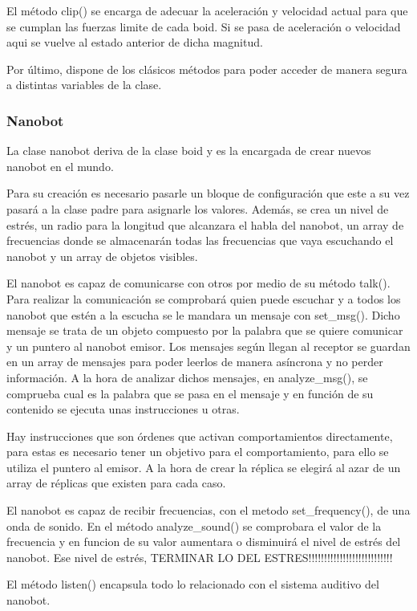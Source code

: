 El método clip() se encarga de adecuar la aceleración y velocidad actual para que se cumplan las fuerzas limite de cada boid. Si se pasa de aceleración o velocidad aqui se vuelve al estado anterior de dicha magnitud.
 
Por último, dispone de los clásicos métodos para poder acceder de manera segura a distintas variables de la clase.

\subsubsection{Nanobot}
\label{sec:nanobot}

La clase nanobot deriva de la clase boid y es la encargada de crear nuevos nanobot en el mundo.
 
Para su creación es necesario pasarle un bloque de configuración que este a su vez pasará a la clase padre para asignarle los valores. Además, se crea un nivel de estrés, un radio para la longitud que alcanzara el habla del nanobot, un array de frecuencias donde se almacenarán todas las frecuencias que vaya escuchando el nanobot y un array de objetos visibles.
 
El nanobot es capaz de comunicarse con otros por medio de su método talk(). Para realizar la comunicación se comprobará quien puede escuchar y a todos los nanobot que estén a la escucha se le mandara un mensaje con set\_msg(). Dicho mensaje se trata de un objeto compuesto por la palabra que se quiere comunicar y un puntero al nanobot emisor. Los mensajes según llegan al receptor se guardan en un array de mensajes para poder leerlos de manera asíncrona y no perder información. A la hora de analizar dichos mensajes, en analyze\_msg(), se comprueba cual es la palabra que se pasa en el mensaje y en función de su contenido se ejecuta unas instrucciones u otras. 

Hay instrucciones que son órdenes que activan comportamientos directamente, para estas es necesario tener un objetivo para el comportamiento, para ello se utiliza el puntero al emisor. A la hora de crear la réplica se elegirá al azar de un array de réplicas que existen para cada caso.
 
El nanobot es capaz de recibir frecuencias, con el metodo set\_frequency(), de una onda de sonido. En el método analyze\_sound() se comprobara el valor de la frecuencia y en funcion de su valor aumentara o disminuirá el nivel de estrés del nanobot. Ese nivel de estrés,
TERMINAR LO DEL ESTRES!!!!!!!!!!!!!!!!!!!!!!!!!!!

El método listen() encapsula todo lo relacionado con el sistema auditivo del nanobot.

